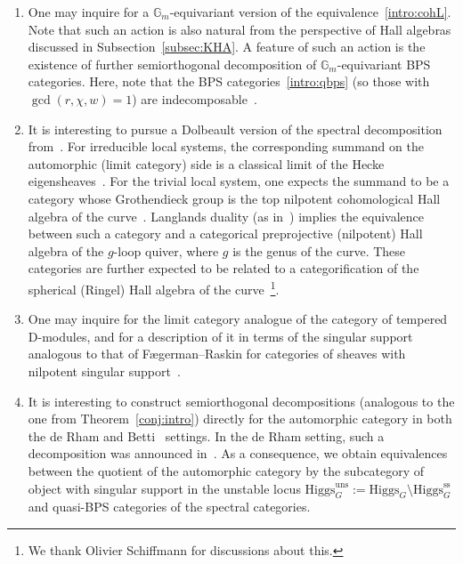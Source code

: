 \documentclass [11pt,oneside,a4paper,mathscr]{amsart}
\theoremstyle{definition}
\newcommand{\Hig}{\mathrm{Higgs}}
\begin{document}
\begin{enumerate}[leftmargin=*]
\item One may inquire for a $\mathbb{G}_m$-equivariant version of the equivalence~\eqref{intro:cohL}. Note that such an action is also natural from the perspective of Hall algebras discussed in Subsection~\ref{subsec:KHA}. A feature of such an action is the existence of further semiorthogonal decomposition of $\mathbb{G}_m$-equivariant BPS categories. Here, note that the BPS categories~\eqref{intro:qbps} (so those with $\gcd(r,\chi,w)=1$) are indecomposable~\cite{PThiggs}. 

\item It is interesting to pursue a Dolbeault version of the spectral decomposition from~\cite{AGKRRV}. For irreducible local systems, the corresponding summand on the automorphic (limit category) side is a classical limit of the Hecke eigensheaves~\cite{FGV}. For the trivial local system, one expects the summand to be a category whose Grothendieck group is the top nilpotent cohomological Hall algebra of the curve~\cite{SalaSchif}. Langlands duality (as in~\cite{AGKRRV}) implies the equivalence between such a category and a categorical preprojective (nilpotent) Hall algebra of the $g$-loop quiver, where $g$ is the genus of the curve. These categories are further expected to be related to a categorification of the spherical (Ringel) Hall algebra of the curve~\cite{MR2944034, OSc}\footnote{We thank Olivier Schiffmann for discussions about this.}.

\item One may inquire for the limit category analogue of the category of tempered D-modules, and for a description of it in terms of the singular support analogous to that of Fægerman--Raskin for categories of sheaves with nilpotent singular support~\cite{FaeRas}.  

\item It is interesting to construct semiorthogonal decompositions (analogous to the one from Theorem~\ref{conj:intro}) directly for the automorphic category in both the de Rham and Betti~\cite{ZN} settings. In the de Rham setting, such a decomposition was announced in~\cite{McNe}.
As a consequence, we obtain equivalences between the quotient of the automorphic category by the subcategory of object with singular support in the unstable locus $\Hig^{\text{uns}}_{G}:=\Hig_{G}\setminus \Hig^{\text{ss}}_{G}$ and quasi-BPS categories of the spectral categories.
\end{enumerate}
\end{document}
